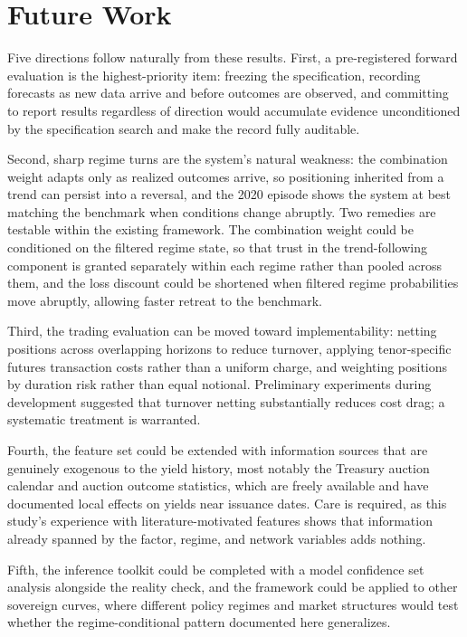 \documentclass[10pt]{article}
\begin{document}
\section{Future Work}

Five directions follow naturally from these results. First, a pre-registered forward evaluation is the highest-priority item: freezing the specification, recording forecasts as new data arrive and before outcomes are observed, and committing to report results regardless of direction would accumulate evidence unconditioned by the specification search and make the record fully auditable.

Second, sharp regime turns are the system's natural weakness: the combination weight adapts only as realized outcomes arrive, so positioning inherited from a trend can persist into a reversal, and the 2020 episode shows the system at best matching the benchmark when conditions change abruptly. Two remedies are testable within the existing framework. The combination weight could be conditioned on the filtered regime state, so that trust in the trend-following component is granted separately within each regime rather than pooled across them, and the loss discount could be shortened when filtered regime probabilities move abruptly, allowing faster retreat to the benchmark.

Third, the trading evaluation can be moved toward implementability: netting positions across overlapping horizons to reduce turnover, applying tenor-specific futures transaction costs rather than a uniform charge, and weighting positions by duration risk rather than equal notional. Preliminary experiments during development suggested that turnover netting substantially reduces cost drag; a systematic treatment is warranted.

Fourth, the feature set could be extended with information sources that are genuinely exogenous to the yield history, most notably the Treasury auction calendar and auction outcome statistics, which are freely available and have documented local effects on yields near issuance dates. Care is required, as this study's experience with literature-motivated features shows that information already spanned by the factor, regime, and network variables adds nothing.

Fifth, the inference toolkit could be completed with a model confidence set analysis alongside the reality check, and the framework could be applied to other sovereign curves, where different policy regimes and market structures would test whether the regime-conditional pattern documented here generalizes.
\end{document}
